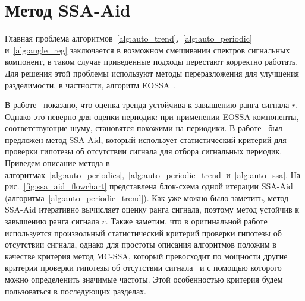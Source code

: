 \documentclass[specialist,
substylefile = spbu_report.rtx,
subf,12pt]{disser}
\newcommand{\Input}{\emph{Входные данные: }}
\newcommand{\Output}{\emph{Результат: }}
\theoremstyle{definition}
\begin{document}

\section{Метод SSA-Aid}\label{sect:ssa_aid}

Главная проблема алгоритмов~\ref{alg:auto_trend},~\ref{alg:auto_periodic} и~\ref{alg:angle_reg} заключается в возможном смешивании спектров сигнальных компонент, в таком случае приведенные подходы перестают корректно работать. Для решения этой проблемы используют методы переразложения для улучшения разделимости, в частности, алгоритм EOSSA~\cite{Shlemov2017}.

В работе~\cite{autoSSA} показано, что оценка тренда устойчива к завышению ранга сигнала $r$. Однако это неверно для оценки периодик: при применении EOSSA компоненты, соответствующие шуму, становятся похожими на периодики. В работе~\cite{Dudnik2025} был предложен метод SSA-Aid, который использует статистический критерий для проверки гипотезы об отсутствии сигнала для отбора сигнальных периодик. Приведем описание метода в алгоритмах~\ref{alg:auto_periodics},~\ref{alg:auto_periodic_trend} и~\ref{alg:auto_ssa}. На рис.~\ref{fig:ssa_aid_flowchart} представлена блок-схема одной итерации SSA-Aid (алгоритма~\ref{alg:auto_periodic_trend}). Как уже можно было заметить, метод SSA-Aid итеративно вычисляет оценку ранга сигнала, поэтому метод устойчив к завышению ранга сигнала $r$. Также заметим, что в оригинальной работе~\cite{Dudnik2025} используется произвольный статистический критерий проверки гипотезы об отсутствии сигнала, однако для простоты описания алгоритмов положим в качестве критерия метод MC-SSA, который превосходит по мощности другие критерии проверки гипотезы об отсутствии сигнала~\cite{Poteshkin2024} и с помощью которого можно определенить значимые частоты. Этой особенностью критерия будем пользоваться в последующих разделах.
\end{document}
